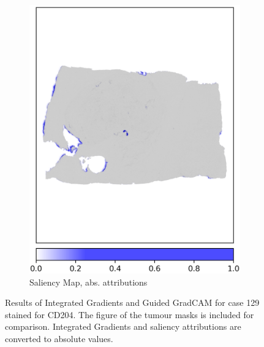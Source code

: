 \begin{figure}[h!t]
\begin{subfigure}[b]{0.49\textwidth}
         \includegraphics[width=\textwidth]{latex/captum/case129/saliency_case129-stain19-dead_414days.png}
         \caption{Saliency Map, abs. attributions}
     \end{subfigure}
    \hfill
    \caption[Integrated gradients, Guided GradCAM and saliency for case 129 stain 19]{Results of Integrated Gradients and Guided GradCAM for case 129 stained for CD204. The figure of the tumour masks is included for comparison. Integrated Gradients and saliency attributions are converted to absolute values.}
    \label{fig:case129}
\end{figure}

